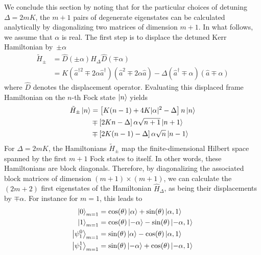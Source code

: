 \documentclass[%
 reprint,
 superscriptaddress,
 amsmath,
 amssymb,
 aps,
 pra,
 10pt
]{revtex4-2}
\newcommand{\adag}{\hat{a}^\dagger}
\newcommand{\adagsq}{\hat{a}^{\dagger 2}}
\newcommand{\hata}{\hat{a}}
\begin{document}
We conclude this section by noting that for the particular choices of detuning $\Delta=2mK$, the $m +1$ pairs of degenerate eigenstates can be calculated analytically by diagonalizing two matrices of dimension $m+1$. In what follows, we assume that $\alpha$ is real. The first step is to displace the detuned Kerr Hamiltonian by~$\pm \alpha$
\begin{equation*}
    \begin{split}
        \tilde{H}_\pm &= \hat D(\pm \alpha) \hat{H}_\Delta \hat D(\mp \alpha) \\
         &= K \left( \adagsq \mp 2 \alpha \adag \right) \left( \hata^2 \mp 2 \alpha \hata \right) -  \Delta (\adag \mp\alpha)( \hata \mp \alpha)
    \end{split}
\end{equation*}
where $\hat D$ denotes the displacement operator. Evaluating this displaced frame Hamiltonian on the $n$-th Fock state $\ket{n}$ yields
\begin{equation}
    \begin{split}
        \tilde{H}_\pm \ket{n} & = \left[K (n-1) + 4 K |\alpha|^2 - \Delta \right] n \ket{n} \\ 
        & \mp \left[2K n - \Delta \right] \alpha \sqrt{n+1} \ket{n+1} \\
        & \mp \left[2K (n-1)  - \Delta \right] \alpha \sqrt{n} \ket{n-1}
    \end{split}
\end{equation}
For $\Delta = 2mK$, the Hamiltonians $\tilde H_\pm$ map the finite-dimensional Hilbert space spanned by the first $m+1$ Fock states to itself. In other words, these Hamiltonians are block diagonals. Therefore, by diagonalizing the associated block matrices of dimension $(m+1)\times(m+1)$, we can calculate the $(2m+2)$ first eigenstates of the Hamiltonian $\hat H_\Delta$, as being their displacements by $\mp\alpha$.  For instance for $m=1$, this leads to
\begin{equation*}
    \begin{split}
        \ket{0}_{m=1} &= \text{cos}(\theta)\ket{\alpha} + \text{sin}(\theta) \ket{\alpha,1} \\
        \ket{{1}}_{m=1} &= \text{cos}(\theta)\ket{-\alpha} - \text{sin}(\theta) \ket{-\alpha,1} \\
        \ket{\psi^0_{1}}_{m=1} &= \text{sin}(\theta)\ket{\alpha} - \text{cos}(\theta) \ket{\alpha,1} \\
        \ket{\psi^1_{1}}_{m=1} &= \text{sin}(\theta)\ket{-\alpha} + \text{cos}(\theta) \ket{-\alpha,1} \\
    \end{split}
\end{equation*}
\end{document}
